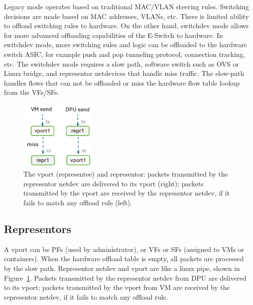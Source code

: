 \documentclass[letterpaper]{article}
\begin{document}
Legacy mode operates based on traditional MAC/VLAN steering rules. Switching
decisions are made based on MAC addresses, VLANs, etc. There is limited ability
to offload switching rules to hardware.
On the other hand, switchdev mode allows for more advanced offloading
capabilities of the E-Switch to hardware. In switchdev mode, more switching
rules and logic can be offloaded to the hardware switch ASIC, for example
push and pop tunneling protocol, connection tracking, etc.
The switchdev mode requires a slow path, software switch such as OVS or
Linux bridge, and representor netdevices that handle miss traffic.
The slow-path handles flows that can not be offloaded or miss the hardware
flow table lookup from the VFs/SFs.
\begin{figure}[t!]
\includegraphics[width=1.5in]{pipe.pdf}
\centering
\caption{The vport (representee) and representor: packets transmitted by the representor 
netdev are delivered to its vport (right); packets transmitted by the vport are
received by the representor netdev, if it fails to match any offload rule (left).}
\label{fig:pipe}
\end{figure}

\subsection{Representors}
A vport can be PFs (used by administrator), or VFs or SFs (assigned to VMs
or containers). When the hardware offload table is empty, all packets are 
processed by the slow path. Representor netdev and vport are like a linux
pipe, shown in Figure~\ref{fig:pipe}. Packets transmitted by the representor
netdev from DPU are delivered to its vport; packets transmitted by the vport
from VM are received by the representor netdev, if it fails to match any
offload rule.
\end{document}
